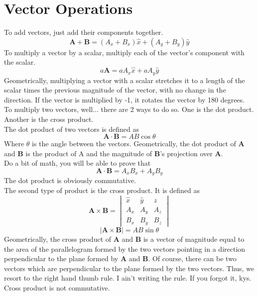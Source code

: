 \documentclass[12pt]{article}
\begin{document}
\section{Vector Operations}
To add vectors, just add their components together.
\begin{equation}
    \mathbf{A}+\mathbf{B}=(A_x+B_x)\hat{x}+(A_y+B_y)\hat{y}
\end{equation}
To multiply a vector by a scalar, multiply each of the vector's component with the scalar.
\begin{equation}
    a\mathbf{A}=aA_x\hat{x}+aA_y\hat{y}
\end{equation}
Geometrically, multiplying a vector with a scalar stretches it to a length of the scalar times the previous magnitude of the vector, with no change in the direction.
If the vector is multiplied by -1, it rotates the vector by 180 degrees.\\
To multiply two vectors, well... there are 2 ways to do so. One is the dot product. Another is the cross product.
\\ The dot product of two vectors is defined as
\begin{equation}
    \mathbf{A} \cdot \mathbf{B}=AB\cos\theta
\end{equation}
Where $\theta$ is the angle between the vectors. Geometrically, the dot product of $\mathbf{A}$ and $\mathbf{B}$ is the product of A and the magnitude of $\mathbf{B}$'s projection over $\mathbf{A}$.
\\ Do a bit of math, you will be able to prove that 
\begin{equation}
    \mathbf{A} \cdot \mathbf{B}=A_xB_x+A_yB_y
\end{equation}
The dot product is obviously commutative. \\
The second type of product is the cross product. It is defined as 
\begin{equation}
    \mathbf{A}\times\mathbf{B}=\begin{vmatrix}
                                \hat{x} & \hat{y} & \hat{z} \\
                                A_x     &   A_y   &   A_z   \\
                                B_x     &   B_y   &   B_z
                                \end{vmatrix}
\end{equation} 
\begin{equation}
    |\mathbf{A}\times\mathbf{B}|=AB\sin\theta
\end{equation}
Geometrically, the cross product of $\mathbf{A}$ and $\mathbf{B}$ is a vector of magnitude equal to the area of the parallelogram formed by the two vectors pointing in a direction perpendicular to the plane formed by $\mathbf{A}$ and $\mathbf{B}$.
Of course, there can be two vectors which are perpendicular to the plane formed by the two vectors. Thus, we resort to the right hand thumb rule. I ain't writing the rule. If you forgot it, kys. 
Cross product is not commutative. 
\end{document}
